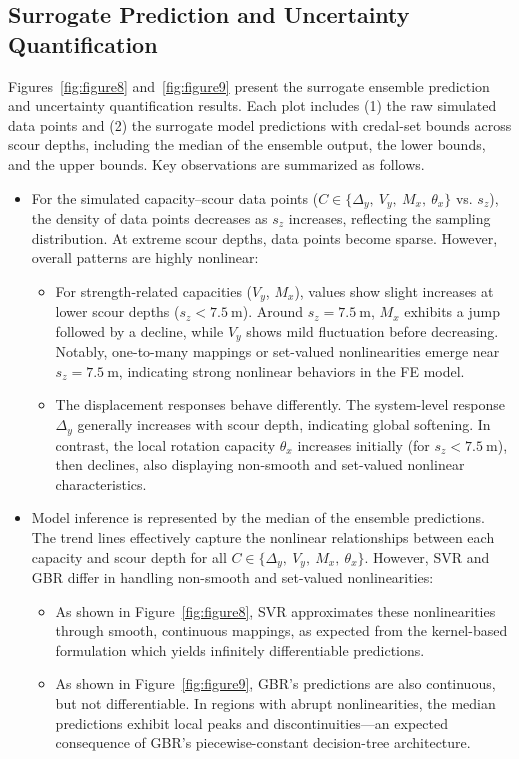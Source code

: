 \documentclass[authoryear,preprint,review,12pt]{elsarticle}
\begin{document}
\subsection{Surrogate Prediction and Uncertainty Quantification}
Figures~\ref{fig:figure8} and~\ref{fig:figure9} present the surrogate ensemble prediction and uncertainty quantification results. Each plot includes (1) the raw simulated data points and (2) the surrogate model predictions with credal-set bounds across scour depths, including the median of the ensemble output, the lower bounds, and the upper bounds. Key observations are summarized as follows.
\begin{itemize}
    \item For the simulated capacity–scour data points ($C \in \{\Delta_y,\ V_y,\ M_x,\ \theta_x\}$ vs. $s_z$), the density of data points decreases as $s_z$ increases, reflecting the sampling distribution. At extreme scour depths, data points become sparse. However, overall patterns are highly nonlinear:
    \begin{itemize}
        \item For strength-related capacities ($V_y$, $M_x$), values show slight increases at lower scour depths ($s_z < 7.5\ \mathrm{m}$). Around $s_z = 7.5\ \mathrm{m}$, $M_x$ exhibits a jump followed by a decline, while $V_y$ shows mild fluctuation before decreasing. Notably, one-to-many mappings or set-valued nonlinearities emerge near $s_z = 7.5\ \mathrm{m}$, indicating strong nonlinear behaviors in the FE model.
        \item The displacement responses behave differently. The system-level response $\Delta_y$ generally increases with scour depth, indicating global softening. In contrast, the local rotation capacity $\theta_x$ increases initially (for $s_z < 7.5\ \mathrm{m}$), then declines, also displaying non-smooth and set-valued nonlinear characteristics.
    \end{itemize}
    
    \item Model inference is represented by the median of the ensemble predictions. The trend lines effectively capture the nonlinear relationships between each capacity and scour depth for all $C \in \{\Delta_y,\ V_y,\ M_x,\ \theta_x\}$. However, SVR and GBR differ in handling non-smooth and set-valued nonlinearities:
    \begin{itemize}
        \item As shown in Figure~\ref{fig:figure8}, SVR approximates these nonlinearities through smooth, continuous mappings, as expected from the kernel-based formulation which yields infinitely differentiable predictions.
        \item As shown in Figure~\ref{fig:figure9}, GBR's predictions are also continuous, but not differentiable. In regions with abrupt nonlinearities, the median predictions exhibit local peaks and discontinuities—an expected consequence of GBR's piecewise-constant decision-tree architecture.
    \end{itemize}
    

\end{itemize}
\end{document}
